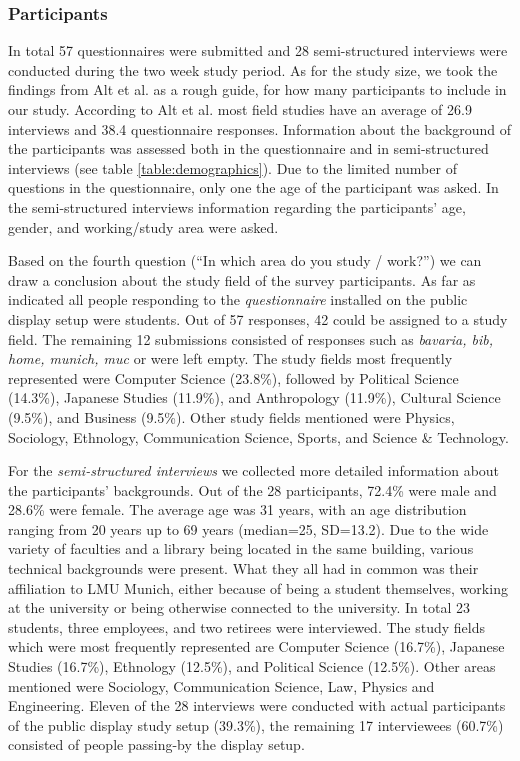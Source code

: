 	\subsubsection{Participants} %
	\label{chapter:field-study:participants}

		In total 57 questionnaires were submitted and 28 semi-structured interviews were conducted during the two week study period. As for the study size, we took the findings from Alt et al.\cite{Alt2012HowToEvaluate} as a rough guide, for how many participants to include in our study. According to Alt et al. most field studies have an average of 26.9 interviews and 38.4 questionnaire responses. Information about the background of the participants was assessed both in the questionnaire and in semi-structured interviews (see table \ref{table:demographics}). Due to the limited number of questions in the questionnaire, only one the age of the participant was asked. In the semi-structured interviews information regarding the participants' age, gender, and working/study area were asked.

		Based on the fourth question (``In which area do you study / work?'') we can draw a conclusion about the study field of the survey participants. As far as indicated all people responding to the \textit{questionnaire} installed on the public display setup were students. Out of 57 responses, 42 could be assigned to a study field. The remaining 12 submissions consisted of responses such as \textit{bavaria, bib, home, munich, muc} or were left empty. The study fields most frequently represented were Computer Science (23.8\%), followed by Political Science (14.3\%), Japanese Studies (11.9\%), and Anthropology (11.9\%), Cultural Science (9.5\%), and Business (9.5\%). Other study fields mentioned were Physics, Sociology, Ethnology, Communication Science, Sports, and Science \& Technology. 

		For the \textit{semi-structured interviews} we collected more detailed information about the participants' backgrounds. Out of the 28 participants, 72.4\% were male and 28.6\% were female. The average age was 31 years, with an age distribution ranging from 20 years up to 69 years (median=25, SD=13.2). Due to the wide variety of faculties and a library being located in the same building, various technical backgrounds were present. What they all had in common was their affiliation to LMU Munich, either because of being a student themselves, working at the university or being otherwise connected to the university. In total 23 students, three employees, and two retirees were interviewed. The study fields which were most frequently represented are Computer Science (16.7\%), Japanese Studies (16.7\%), Ethnology (12.5\%), and Political Science (12.5\%). Other areas mentioned were Sociology, Communication Science, Law, Physics and Engineering. 
		Eleven of the 28 interviews were conducted with actual participants of the public display study setup (39.3\%), the remaining 17 interviewees (60.7\%) consisted of people passing-by the display setup.


